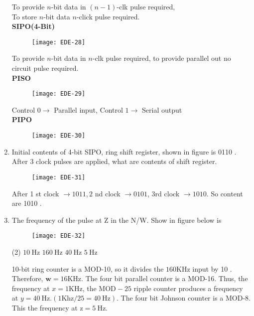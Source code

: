 \begin{enumerate}
To provide $n$-bit data in $(n-1)$-clk pulse required, \\
To store $n$-bit data $n$-click pulse required.\\
\textbf{SIPO(4-Bit)}
\begin{figure}[H]
	\centering
	\texttt{[image: EDE-28]}
\end{figure}
To provide $n$-bit data in $n$-clk pulse required, to provide parallel out no circuit pulse required.\\
\textbf { PISO }
\begin{figure}[H]
	\centering
	\texttt{[image: EDE-29]}
\end{figure}
Control $0 \rightarrow$ Parallel input, Control $1 \rightarrow$ Serial output\\
\textbf{ PIPO}
\begin{figure}[H]
	\centering
	\texttt{[image: EDE-30]}
\end{figure}
\item Initial contents of 4-bit SIPO, ring shift register, shown in figure is 0110 . After 3 clock pulses are applied, what are contents of shift register.
\begin{figure}[H]
	\centering
	\texttt{[image: EDE-31]}
\end{figure}
\begin{answer}
	After 1 st clock $\rightarrow 1011,2$ nd clock $\rightarrow 0101$, 3rd clock $\rightarrow 1010$. So content are 1010 .
\end{answer}
\item The frequency of the pulse at $\mathrm{Z}$ in the N/W. Show in figure below is
\begin{figure}[H]
	\centering
	\texttt{[image: EDE-32]}
\end{figure}
 \begin{tasks}(2)
	\task[\textbf{a.}]$10 \mathrm{~Hz}$
	\task[\textbf{b.}]$160 \mathrm{~Hz}$
	\task[\textbf{c.}]$40 \mathrm{~Hz}$
	\task[\textbf{d.}] $5 \mathrm{~Hz}$
\end{tasks}
\begin{answer}
10-bit ring counter is a MOD-10, so it divides the $160 \mathrm{KHz}$ input by 10 . Therefore, $\mathbf{w}=16 \mathrm{KHz}$. The four bit parallel counter is a MOD-16. Thus, the frequency at $x=1 \mathrm{KHz}$, the $\mathrm{MOD}-25$ ripple counter produces a frequency at $y=40 \mathrm{~Hz} .(1 \mathrm{Khz} / 25=40 \mathrm{~Hz})$. The four bit Johnson counter is a MOD-8. This the frequency at $\mathrm{z}=5 \mathrm{~Hz}$.

\end{answer}
\end{enumerate}
